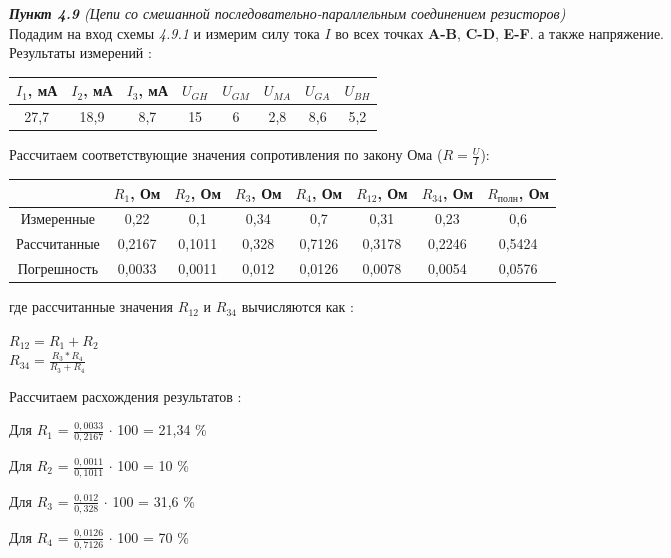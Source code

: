 \documentclass[a4paper,11pt]{article}
\begin{document}
	\begin{flushleft}
		\textit{\textbf{Пункт 4.9 } (Цепи со смешанной последовательно-параллельным соединением резисторов)}
		\\
		\medskip
		\hangindent=1.5cm  \noindent
		Подадим на вход схемы \textit{4.9.1} и измерим силу тока ${I}$ во всех точках \textbf{A-B}, \textbf{C-D}, \textbf{E-F}. а также напряжение.\\
		Результаты измерений :
		\begin{center}
				\begin{tabular}{|c|c|c|c|c|c|c|c|}
\hline ${I_1}$, мА & ${I_2}$, мА & ${I_3}$, мА & ${U_{GH}}$ & ${U_{GM}}$ & ${U_{MA}}$ & ${U_{GA}}$ & ${U_{BH}}$ \\ 
\hline 27,7 & 18,9 & 8,7 & 15 & 6 & 2,8 & 8,6 & 5,2 \\ 
\hline 
\end{tabular} 
		\end{center} 
		Рассчитаем соответствующие значения сопротивления по закону Ома (${R=\frac{U}{I}}$):
		\begin{center}
			\begin{tabular}{|c|c|c|c|c|c|c|c|}
\hline  & ${R_1}$, Ом & ${R_2}$, Ом & ${R_3}$, Ом & ${R_4}$, Ом & ${R_{12}}$, Ом & ${R_{34}}$, Ом & ${R_{полн}}$, Ом \\ 
\hline Измеренные & 0,22 & 0,1 & 0,34 & 0,7 & 0,31 & 0,23 & 0,6 \\ 
\hline Рассчитанные & 0,2167 & 0,1011 &  0,328 & 0,7126 & 0,3178 & 0,2246 & 0,5424 \\ 
\hline Погрешность & 0,0033 & 0,0011 & 0,012 & 0,0126 & 0,0078 & 0,0054 & 0,0576 \\ 
\hline 
\end{tabular} 
		\end{center}
	где рассчитанные значения ${R_{12}}$ и ${R_{34}}$ вычисляются как :
	\begin{center}
		${R_{12}= R_1 + R_2}$ \\\medskip
		${R_{34}= \frac{R_3*R_4}{R_3+R_4}}$	
	\end{center}
	Рассчитаем расхождения результатов :
	\begin{list}{}{\leftmargin=3cm}
		\item Для ${R_1}$ = ${\frac{0,0033}{0,2167}}$ ${\cdot}$ 100  = 21,34 \%
		\item Для ${R_2}$ = ${\frac{0,0011}{0,1011}}$ ${\cdot}$ 100  = 10 \%
		\item Для ${R_3}$ = ${\frac{0,012}{0,328}}$ ${\cdot}$ 100  = 31,6 \%
		\item Для ${R_4}$ = ${\frac{0,0126}{0,7126}}$ ${\cdot}$ 100  = 70 \%
	\end{list}
	\end{flushleft}
			
\end{document}
